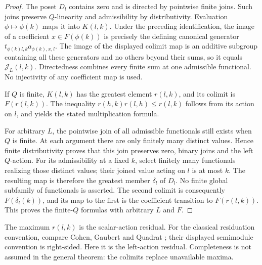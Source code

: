 \begin{proof}
The poset $D_l$ contains zero and is directed by pointwise finite
joins. Such joins preserve $Q$-linearity and admissibility by
distributivity. Evaluation $\phi\mapsto\phi(k)$ maps it into
$K(l,k)$. Under the preceding identification, the image of a coefficient
$x\in F(\phi(k))$ is precisely the defining canonical generator
$t_{\phi(k)l,k}a_{\phi(k),x,l}$. The image of the displayed colimit
map is an additive subgroup containing all these generators and no
others beyond their sums, so it equals $\mathcal J_L(l,k)$.
Directedness combines every finite sum at one admissible functional.
No injectivity of any coefficient map is used.

If $Q$ is finite, $K(l,k)$ has the greatest element $r(l,k)$, and its
colimit is $F(r(l,k))$. The inequality
$r(h,k)r(l,h)\leq r(l,k)$ follows from its action on $l$, and yields
the stated multiplication formula.

For arbitrary $L$, the pointwise join of all admissible functionals
still exists when $Q$ is finite. At each argument there are only
finitely many distinct values. Hence finite distributivity proves that
this join preserves zero, binary joins and the left $Q$-action.
For its admissibility at a fixed $k$, select finitely many functionals
realizing those distinct values; their joined value acting on $l$ is
at most $k$. The resulting map is therefore the greatest member
$\delta_l$ of $D_l$. No finite global subfamily of functionals is
asserted. The second colimit is consequently $F(\delta_l(k))$, and
its map to the first is the coefficient transition to $F(r(l,k))$.
This proves the finite-$Q$ formulas with arbitrary $L$ and $F$.
\end{proof}
The maximum $r(l,k)$ is the scalar-action residual. For the classical
residuation convention, compare Cohen, Gaubert and Quadrat
\cite[Sections~2.1--2.2, equations~(2)--(3) and~(13)--(14) of the
preprint]{CGQ}; their displayed semimodule convention is right-sided.
Here it is the left-action residual. Completeness is not assumed in the
general theorem: the colimits replace unavailable maxima.

